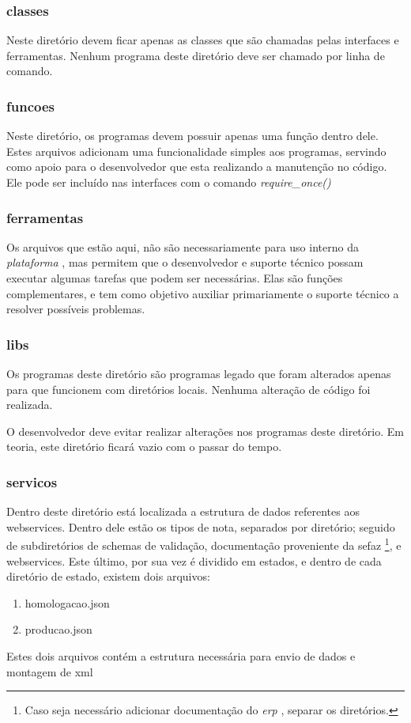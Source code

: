 \documentclass[a4paper]{article}
\newcommand{\nf}{\emph{plataforma} }
\newcommand{\erp}{\emph{erp} }
\newcommand{\dev}{desenvolvedor }
\begin{document}
\subsubsection{classes}
Neste diretório devem ficar apenas as classes que são chamadas pelas interfaces e ferramentas. Nenhum programa deste diretório deve ser chamado por linha de comando.

\subsubsection{funcoes}
Neste diretório, os programas devem possuir apenas uma função dentro dele. Estes arquivos adicionam uma funcionalidade simples aos programas, servindo como apoio para o \dev que esta realizando a manutenção no código. Ele pode ser incluído nas interfaces com o comando \emph{require\_once()} 

\subsubsection{ferramentas}
Os arquivos que estão aqui, não são necessariamente para uso interno da \nf, mas permitem que o \dev e suporte técnico possam executar algumas tarefas que podem ser necessárias. Elas são funções complementares, e tem como objetivo auxiliar primariamente o suporte técnico a resolver possíveis problemas.
\subsubsection{libs}
Os programas deste diretório são programas legado que foram alterados apenas para que funcionem com diretórios locais. Nenhuma alteração de código foi realizada. 

O \dev deve evitar realizar alterações nos programas deste diretório. Em teoria, este diretório ficará vazio com o passar do tempo.

\subsubsection{servicos}
Dentro deste diretório está localizada a estrutura de dados referentes aos webservices. Dentro dele estão os tipos de nota, separados por diretório; seguido de subdiretórios de schemas de validação, documentação proveniente da sefaz \footnote{Caso seja necessário adicionar documentação do \erp, separar os diretórios.}, e webservices. Este último, por sua vez é dividido em estados, e dentro de cada diretório de estado, existem dois arquivos:
\begin{enumerate}
	\item homologacao.json
	\item producao.json
\end{enumerate}
Estes dois arquivos contém a estrutura necessária para envio de dados e montagem de xml
\end{document}

